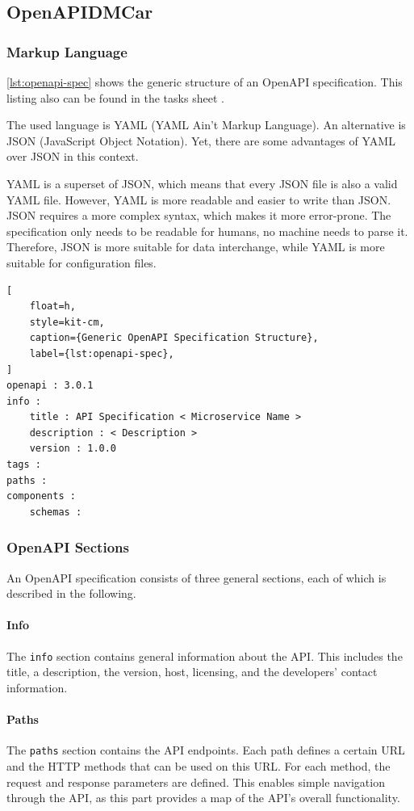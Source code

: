 \subsection{OpenAPIDMCar}
\subsubsection*{Markup Language}
\autoref*{lst:openapi-spec} shows the generic structure of an OpenAPI specification.
This listing also can be found in the tasks sheet \cite{CM-T-DMC}.

The used language is YAML (YAML Ain't Markup Language).
An alternative is JSON (JavaScript Object Notation).
Yet, there are some advantages of YAML over JSON in this context.

YAML is a superset of JSON, which means that every JSON file is also a valid YAML file.
However, YAML is more readable and easier to write than JSON.
JSON requires a more complex syntax, which makes it more error-prone.
The specification only needs to be readable for humans, no machine needs to parse it.
Therefore, JSON is more suitable for data interchange, while YAML is more suitable for configuration files.

\begin{lstlisting}[
    float=h,
    style=kit-cm,
    caption={Generic OpenAPI Specification Structure},
    label={lst:openapi-spec},
]
openapi : 3.0.1
info :
    title : API Specification < Microservice Name >
    description : < Description >
    version : 1.0.0
tags :
paths :
components :
    schemas :
\end{lstlisting}

\subsubsection*{OpenAPI Sections}
An OpenAPI specification consists of three general sections, each of which is described in the following.
\paragraph*{Info}
The \texttt{info} section contains general information about the API.
This includes the title, a description, the version, host, licensing, and the developers' contact information.

\paragraph*{Paths}
The \texttt{paths} section contains the API endpoints.
Each path defines a certain URL and the HTTP methods that can be used on this URL.
For each method, the request and response parameters are defined.
This enables simple navigation through the API, as this part provides a map of the API's overall functionality.

